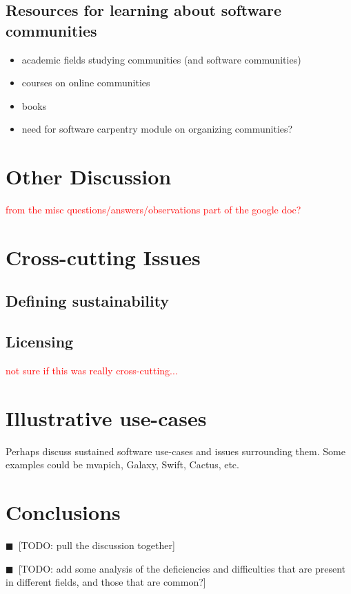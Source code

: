 \documentclass[11pt, oneside]{amsart}
\newcommand{\todo}[1]{{\color{blue}$\blacksquare$~\textsf{[TODO: #1]}}}
\newcommand{\note}[1]{ {\textcolor{red}    { #1 }}}
\begin{document}
\subsection{Resources for learning about software communities}
\begin{itemize}
\item academic fields studying communities (and software communities)
\item courses on online communities
\item books
\item need for software carpentry module on organizing communities?
\end{itemize}

\section{Other Discussion}

\note{from the misc questions/answers/observations part of the google doc?}

\section{Cross-cutting Issues}

\subsection{Defining sustainability}

\subsection{Licensing}

\note{not sure if this was really cross-cutting...}


\section{Illustrative use-cases}

Perhaps discuss sustained software use-cases and issues surrounding them. Some examples could be mvapich, Galaxy, Swift, Cactus, etc.

\section{Conclusions}

\todo{pull the discussion together}

\todo{add some analysis of the deficiencies and difficulties that are present in different fields, and those that are common?}
\end{document}
